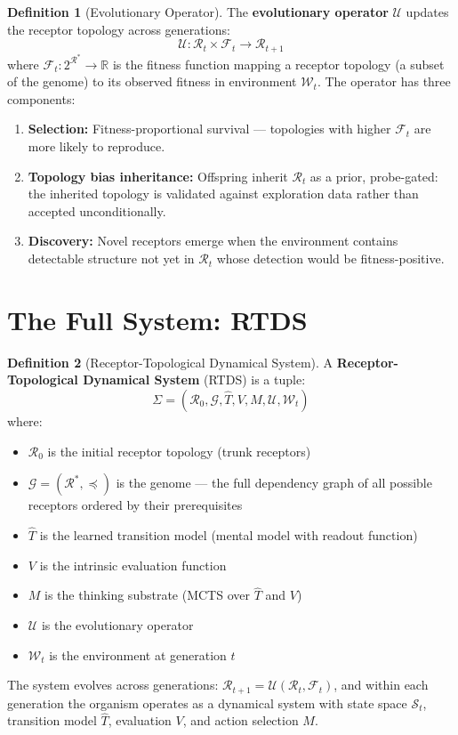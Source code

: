 \documentclass[12pt]{article}
\theoremstyle{definition}
\newtheorem{definition}{Definition}
\begin{document}
\begin{definition}[Evolutionary Operator]
The \textbf{evolutionary operator} $\mathcal{U}$ updates the receptor topology across
generations:
\[
\mathcal{U} : \mathcal{R}_t \times \mathcal{F}_t \to \mathcal{R}_{t+1}
\]
where $\mathcal{F}_t : 2^{\mathcal{R}^*} \to \mathbb{R}$ is the fitness function mapping
a receptor topology (a subset of the genome) to its observed fitness in environment
$\mathcal{W}_t$. The operator has three components:
\begin{enumerate}
    \item \textbf{Selection:} Fitness-proportional survival --- topologies with higher
    $\mathcal{F}_t$ are more likely to reproduce.
    \item \textbf{Topology bias inheritance:} Offspring inherit $\mathcal{R}_t$ as a
    prior, probe-gated: the inherited topology is validated against exploration data
    rather than accepted unconditionally.
    \item \textbf{Discovery:} Novel receptors emerge when the environment contains
    detectable structure not yet in $\mathcal{R}_t$ whose detection would be
    fitness-positive.
\end{enumerate}
\end{definition}

\section{The Full System: RTDS}

\begin{definition}[Receptor-Topological Dynamical System]
A \textbf{Receptor-Topological Dynamical System} (RTDS) is a tuple:
\[
\Sigma = (\mathcal{R}_0, \mathcal{G}, \hat{T}, V, M, \mathcal{U}, \mathcal{W}_t)
\]
where:
\begin{itemize}
    \item $\mathcal{R}_0$ is the initial receptor topology (trunk receptors)
    \item $\mathcal{G} = (\mathcal{R}^*, \preceq)$ is the genome --- the full dependency graph
    of all possible receptors ordered by their prerequisites
    \item $\hat{T}$ is the learned transition model (mental model with readout function)
    \item $V$ is the intrinsic evaluation function
    \item $M$ is the thinking substrate (MCTS over $\hat{T}$ and $V$)
    \item $\mathcal{U}$ is the evolutionary operator
    \item $\mathcal{W}_t$ is the environment at generation $t$
\end{itemize}
The system evolves across generations: $\mathcal{R}_{t+1} = \mathcal{U}(\mathcal{R}_t, \mathcal{F}_t)$,
and within each generation the organism operates as a dynamical system with state space
$\mathcal{S}_t$, transition model $\hat{T}$, evaluation $V$, and action selection $M$.
\end{definition}
\end{document}
